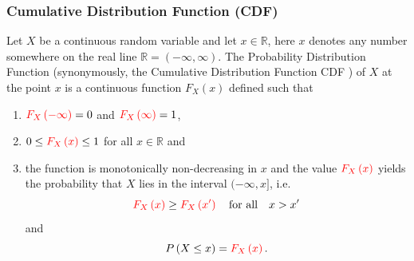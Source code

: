 \documentclass[notes=show,smaller,handout]{beamer}
\renewcommand{\Pr}{P}
\newenvironment{stepenumerate}{\begin{enumerate}[<+->]}{\end{enumerate}}
\begin{document}
\begin{frame}%

\frametitle{Cumulative Distribution Function (CDF)}

\begin{definition}
 Let $X$ be a continuous random variable and let $x\in \mathbb{R}$, here $x$ denotes any number somewhere on the real line $\mathbb{R}=(-\infty,\infty)$. The Probability Distribution Function (synonymously, the Cumulative Distribution Function
\color{red}%
CDF%
\color{black}) of $X$ at the point $x$ is a continuous function
\color{red}%
$F_{X}\left( x\right) $
\color{black}
defined such that
\begin{stepenumerate} \vspace{0.3cm}
\item $\color{red}F_{X}\left( -\infty\right)\color{black}=0$ and $\color{red}F_{X}\left(\infty\right)\color{black}=1$,\vspace{0.3cm}
\item $0\leq \color{red}F_{X}\left( x\right)\color{black} \leq 1$ for all $x\in \mathbb{R}$ and\vspace{0.3cm}
\item the function is monotonically non-decreasing in $x$ and the value $\color{red}F_{X}\left( x\right)\color{black} $ yields the probability that $X$ lies in the interval $(-\infty,x]$, i.e.%
$$
\color{red} F_{X}\left( x\right)\color{black}\geq \color{red}F_{X}\left( x'\right)\color{black}\quad\mbox{for all}\quad x>x'
$$
and
$$
\Pr \left( X\leq x\right)=\color{red}F_{X}\left( x\right) \color{black}.
$$
\end{stepenumerate}
\end{definition}
\end{frame}%
\end{document}
